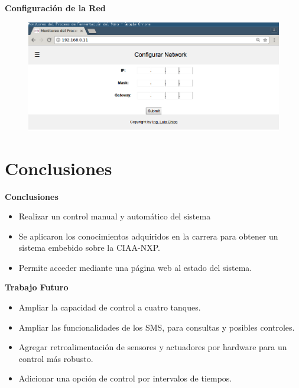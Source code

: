 \documentclass[11pt]{beamer}
\begin{document}
\begin{frame}{\textbf{\LARGE{Configuración de la Red}}}
  \vspace{-.7cm}
  \begin{figure}[H]
    {\includegraphics[width=1\textwidth]{./imagenes/config_network.png}}
  \end{figure}	
\end{frame}

\section{Conclusiones}

\begin{frame}{\textbf{\LARGE{Conclusiones}}}
  \fontsize{16pt}{16}\selectfont
  \begin{itemize}
    \item Realizar un control manual y automático del sistema
      \vspace{10px}
    \item Se aplicaron los conocimientos adquiridos en la carrera para obtener un sistema embebido sobre la CIAA-NXP.
      \vspace{10px}
    \item Permite acceder mediante una página web al estado del sistema.
  \end{itemize}
\end{frame}

\begin{frame}{\textbf{\LARGE{Trabajo Futuro}}}
  \fontsize{16pt}{16}\selectfont
  \begin{itemize}
    \item Ampliar la capacidad de control a cuatro tanques.
      \vspace{15px}
    \item Ampliar las funcionalidades de los SMS, para consultas y posibles controles. 
      \vspace{15px}
    \item Agregar retroalimentación de sensores y actuadores por hardware para un control más robusto.
      \vspace{15px}
    \item Adicionar una opción de control por intervalos de tiempos. 
  \end{itemize}
\end{frame}
\end{document}
